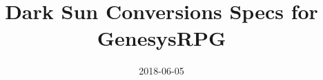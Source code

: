\documentclass[a4paper, openright, 8pt]{report}
\title{Dark Sun Conversions Specs for GenesysRPG}
\date{2018-06-05}
\begin{document}
\renewcommand{\constRacesShowImage}{false}
\renewcommand{\constReferItemQualities}{false}




\arcanaTree

\archerTree

\assassinTree

\beastRiderTree
%

\charmerTree
%
%

\duneTraderTree

\gladiatorTree
%

\mercenaryTree
%

\performerTree

\doctorTree

\primalTree

\psionTree
%
%

\scoutTree
%

\thiefTree

\end{document}
